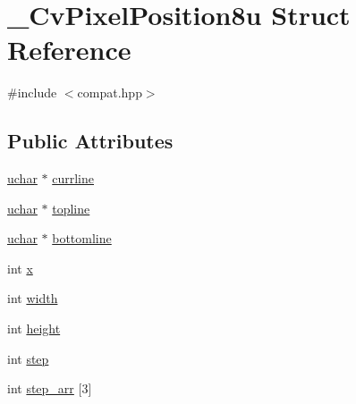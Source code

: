 \hypertarget{struct__CvPixelPosition8u}{\section{\-\_\-\-Cv\-Pixel\-Position8u Struct Reference}
\label{struct__CvPixelPosition8u}
}


{\ttfamily \#include $<$compat.\-hpp$>$}

\subsection*{Public Attributes}
\begin{DoxyCompactItemize}
\item 
\hyperlink{core_2types__c_8h_a65f85814a8290f9797005d3b28e7e5fc}{uchar} $\ast$ \hyperlink{struct__CvPixelPosition8u_a6a9bda68917643165be387246c543dca}{currline}
\item 
\hyperlink{core_2types__c_8h_a65f85814a8290f9797005d3b28e7e5fc}{uchar} $\ast$ \hyperlink{struct__CvPixelPosition8u_a11bc495a5f8fdcfd6bf5490268fe8581}{topline}
\item 
\hyperlink{core_2types__c_8h_a65f85814a8290f9797005d3b28e7e5fc}{uchar} $\ast$ \hyperlink{struct__CvPixelPosition8u_a8f1fbe542accf7cf54288a2515c57d0a}{bottomline}
\item 
int \hyperlink{struct__CvPixelPosition8u_ad52f7663e0fd0e8f9867dd168ae8ecc2}{x}
\item 
int \hyperlink{struct__CvPixelPosition8u_a0c55ef48b276bdf2ed3aa126a42bab12}{width}
\item 
int \hyperlink{struct__CvPixelPosition8u_ac14134c23d6a4d84271afdd047fc3513}{height}
\item 
int \hyperlink{struct__CvPixelPosition8u_a973b65fc90204b43bacff3c72ed9aa3d}{step}
\item 
int \hyperlink{struct__CvPixelPosition8u_a7dd5900e39e061cefbb5bb115de58d01}{step\-\_\-arr} \mbox{[}3\mbox{]}
\end{DoxyCompactItemize}


